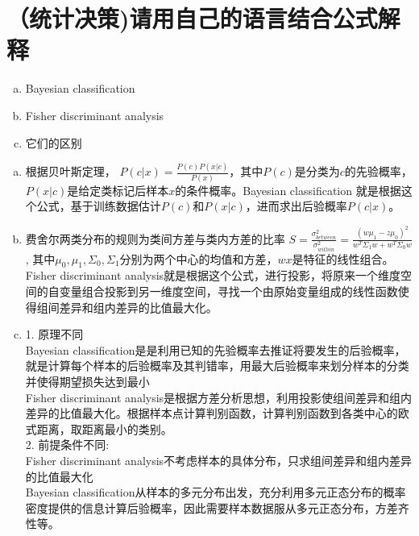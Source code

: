 \documentclass[11pt]{article}
\newenvironment{answer}{\par\color{MidnightBlue}}{\par}
\begin{document}
\section{（统计决策)请用自己的语言结合公式解释}
\begin{enumerate}[(a)]
    \item Bayesian classification
    \item Fisher discriminant	analysis
    \item 它们的区别
\end{enumerate}
\begin{answer}
\begin{enumerate}[(a)]
    \item 根据贝叶斯定理， $P(c|x)=\frac{P(c)P(x|c)}{P(x)}$，其中$P(c)$是分类为$c$的先验概率， $P(x|c)$是给定类标记后样本$x$的条件概率。Bayesian classification 就是根据这个公式，基于训练数据估计$P(c)$和$P(x|c)$，进而求出后验概率$P(c|x)$。
    \item
    费舍尔两类分布的规则为类间方差与类内方差的比率
    $S=\frac{\sigma_{between}^2}{\sigma_{within}^2} = \frac{(w\mu_1-z\mu_0)^2}{w^T\Sigma_1 w + w^T\Sigma_0 w}$,
    其中$\mu_0, \mu_1, \Sigma_0, \Sigma_1$分别为两个中心的均值和方差，$wx$是特征的线性组合。\\
    Fisher discriminant	analysis就是根据这个公式，进行投影，将原来一个维度空间的自变量组合投影到另一维度空间，寻找一个由原始变量组成的线性函数使得组间差异和组内差异的比值最大化。
    \item
1. 原理不同\\
Bayesian classification是是利用已知的先验概率去推证将要发生的后验概率，就是计算每个样本的后验概率及其判错率，用最大后验概率来划分样本的分类并使得期望损失达到最小 \\
Fisher discriminant	analysis是根据方差分析思想，利用投影使组间差异和组内差异的比值最大化。根据样本点计算判别函数，计算判别函数到各类中心的欧式距离，取距离最小的类别。\\
2. 前提条件不同:\\
Fisher discriminant	analysis不考虑样本的具体分布，只求组间差异和组内差异的比值最大化 \\
Bayesian classification从样本的多元分布出发，充分利用多元正态分布的概率密度提供的信息计算后验概率，因此需要样本数据服从多元正态分布，方差齐性等。\\

\end{enumerate}
\end{answer}
\end{document}
